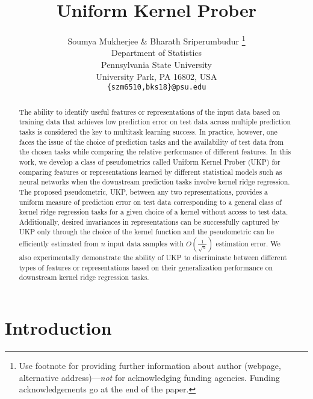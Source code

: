\documentclass{article} %
\title{Uniform Kernel Prober}
\author{Soumya Mukherjee \& Bharath Sriperumbudur \thanks{ Use footnote for providing further information
about author (webpage, alternative address)---\emph{not} for acknowledging
funding agencies.  Funding acknowledgements go at the end of the paper.} \\
Department of Statistics\\
Pennsylvania State University\\
University Park, PA 16802, USA \\
\texttt{\{szm6510,bks18\}@psu.edu}
}
\theoremstyle{plain}
\begin{document}
\maketitle

\begin{abstract}
The ability to identify useful features or representations of the input data based on training data that achieves low prediction error on test data across multiple prediction tasks is considered the key to multitask learning success. In practice, however, one faces the issue of the choice of prediction tasks and the availability of test data from the chosen tasks while comparing the relative performance of different features. In this work, we develop a class of pseudometrics called Uniform Kernel Prober (UKP) for comparing features or representations learned by different statistical models such as neural networks when the downstream prediction tasks involve kernel ridge regression. The proposed pseudometric, UKP, between any two representations, provides a uniform measure of prediction error on test data corresponding to a general class of kernel ridge regression tasks for a given choice of a kernel without access to test data. Additionally, desired invariances in representations can be successfully captured by UKP only through the choice of the kernel function and the pseudometric can be efficiently estimated from $n$ input data samples with $O(\frac{1}{\sqrt{n}})$ estimation error. We also experimentally demonstrate the ability of UKP to discriminate between different types of features or representations based on their generalization performance on downstream kernel ridge regression tasks.
\end{abstract}

\section{Introduction}
\end{document}
